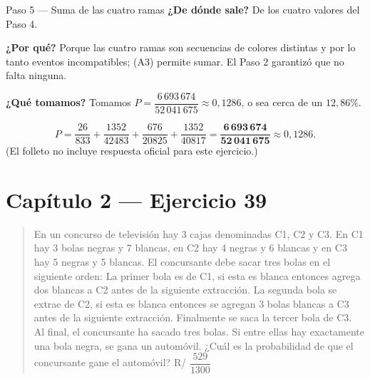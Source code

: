 \documentclass[11pt]{article}
\begin{document}
\begin{sol}
\begin{paso}{Paso 5 --- Suma de las cuatro ramas}
\textbf{¿De d\'onde sale?} De los cuatro valores del Paso 4.

\textbf{¿Por qu\'e?} Porque las cuatro ramas son secuencias de colores distintas y por lo tanto eventos incompatibles; (A3) permite sumar. El Paso 2 garantiz\'o que no falta ninguna.

\textbf{¿Qu\'e tomamos?} Tomamos $P=\dfrac{6\,693\,674}{52\,041\,675}\approx 0{,}1286$, o sea cerca de un $12{,}86\%$.
\end{paso}

\end{sol}

\begin{resp}
\[
P=\frac{26}{833}+\frac{1352}{42483}+\frac{676}{20825}+\frac{1352}{40817}
=\mathbf{\frac{6\,693\,674}{52\,041\,675}}\approx 0{,}1286 .
\]
(El folleto no incluye respuesta oficial para este ejercicio.)
\end{resp}

\section*{Cap\'itulo 2 --- Ejercicio 39}

\begin{quote}
En un concurso de televisi\'on hay 3 cajas denominadas C1, C2 y C3. En C1 hay 3 bolas negras y 7 blancas, en C2 hay 4 negras y 6 blancas y en C3 hay 5 negras y 5 blancas. El concursante debe sacar tres bolas en el siguiente orden: La primer bola es de C1, si esta es blanca entonces agrega dos blancas a C2 antes de la siguiente extracci\'on. La segunda bola se extrae de C2, si esta es blanca entonces se agregan 3 bolas blancas a C3 antes de la siguiente extracci\'on. Finalmente se saca la tercer bola de C3. Al final, el concursante ha sacado tres bolas. Si entre ellas hay exactamente una bola negra, se gana un autom\'ovil. ¿Cu\'al es la probabilidad de que el concursante gane el autom\'ovil? \hfill R/ $\dfrac{529}{1300}$
\end{quote}
\end{document}
